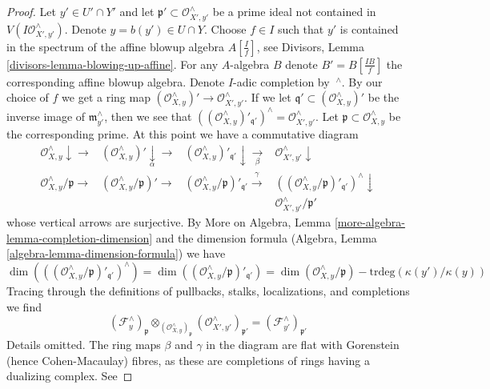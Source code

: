 \begin{proof}
\medskip\noindent
Let $y' \in U' \cap Y'$ and let
$\mathfrak p' \subset \mathcal{O}_{X', y'}^\wedge$
be a prime ideal not contained in $V(I\mathcal{O}_{X', y'}^\wedge)$.
Denote $y = b(y') \in U \cap Y$. Choose $f \in I$ such that
$y'$ is contained in the spectrum of the affine blowup algebra
$A[\frac{I}{f}]$, see Divisors, Lemma \ref{divisors-lemma-blowing-up-affine}.
For any $A$-algebra $B$ denote $B' = B[\frac{IB}{f}]$ the corresponding affine
blowup algebra. Denote $I$-adic completion by ${\ }^\wedge$.
By our choice of $f$ we get a ring map
$(\mathcal{O}_{X, y}^\wedge)' \to \mathcal{O}_{X', y'}^\wedge$.
If we let $\mathfrak q' \subset (\mathcal{O}_{X, y}^\wedge)'$
be the inverse image of $\mathfrak m_{y'}^\wedge$, then
we see that
$((\mathcal{O}_{X, y}^\wedge)'_{\mathfrak q'})^\wedge =
\mathcal{O}_{X', y'}^\wedge$.
Let $\mathfrak p \subset \mathcal{O}_{X, y}^\wedge$ be the corresponding
prime. At this point we have a commutative diagram
$$
\begin{array}{cccc}\mathcal{O}_{X, y}^\wedge \downarrow\longrightarrow & (\mathcal{O}_{X, y}^\wedge)' \underset{\alpha}{\downarrow}\longrightarrow & (\mathcal{O}_{X, y}^\wedge)'_{\mathfrak q'} \downarrow\underset{\beta}{\longrightarrow} & \mathcal{O}_{X', y'}^\wedge \downarrow \\ \mathcal{O}_{X, y}^\wedge/\mathfrak p \longrightarrow & (\mathcal{O}_{X, y}^\wedge/\mathfrak p)' \longrightarrow & (\mathcal{O}_{X, y}^\wedge/\mathfrak p)'_{\mathfrak q'} \overset{\gamma}{\longrightarrow} & ((\mathcal{O}_{X, y}^\wedge/\mathfrak p)'_{\mathfrak q'})^\wedge \downarrow \\  &  &  & \mathcal{O}_{X', y'}^\wedge/\mathfrak p'\end{array}
$$
whose vertical arrows are surjective. By
More on Algebra, Lemma \ref{more-algebra-lemma-completion-dimension}
and the dimension formula
(Algebra, Lemma \ref{algebra-lemma-dimension-formula})
we have
$$
\dim(((\mathcal{O}_{X, y}^\wedge/\mathfrak p)'_{\mathfrak q'})^\wedge) =
\dim((\mathcal{O}_{X, y}^\wedge/\mathfrak p)'_{\mathfrak q'}) =
\dim(\mathcal{O}_{X, y}^\wedge/\mathfrak p)
- \text{trdeg}(\kappa(y')/\kappa(y))
$$
Tracing through the definitions of pullbacks, stalks, localizations,
and completions we find
$$
(\mathcal{F}_y^\wedge)_{\mathfrak p}
\otimes_{(\mathcal{O}_{X, y}^\wedge)_\mathfrak p}
(\mathcal{O}_{X', y'}^\wedge)_{\mathfrak p'}
=
(\mathcal{F}_{y'}^\wedge)_{\mathfrak p'}
$$
Details omitted. The ring maps $\beta$ and $\gamma$ in the diagram
are flat with Gorenstein (hence Cohen-Macaulay) fibres, as these are
completions of rings having a dualizing complex. See

\end{proof}
